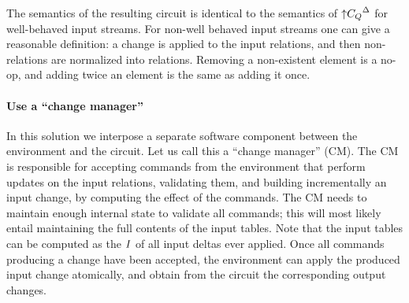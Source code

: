 The semantics of the resulting circuit is identical to the semantics of ${{\uparrow}C_Q}^{\Delta}$
for well-behaved input streams.  For non-well behaved input streams one can give
a reasonable definition: a change is applied to the input relations, and then non-relations
are normalized into relations.  Removing a non-existent element is a no-op, and adding twice
an element is the same as adding it once.

\paragraph{Use a ``change manager''}

In this solution we interpose a separate software component between the environment
and the circuit.  Let us call this a ``change manager'' (CM).  The CM
is responsible for accepting commands from the environment that perform updates on the input
relations, validating them, and building incrementally an input change, by computing the
effect of the commands.  The CM needs to maintain enough internal state to validate all commands; this 
will most likely entail maintaining the full contents of the input tables.  Note that
the input tables can be computed as the $\mathit{I}$ of all input deltas ever applied.  Once all 
commands producing a change have been accepted, the environment can apply the produced input change
atomically, and obtain from the circuit the corresponding output changes.

